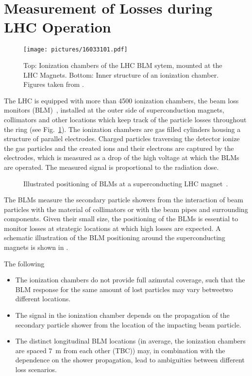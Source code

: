 \section{Measurement of Losses during LHC Operation}
%
\begin{figure}[b]  
    \centering
    \texttt{[image: pictures/16033101.pdf]}
    \caption{Top: Ionization chambers of the LHC BLM sytem, mounted at the LHC Magnets. Bottom: Inner structure of an ionization chamber. Figures taken from \cite{BLM_homepage}.}  
    \label{pic:16033101}
\end{figure}

The LHC is equipped with more than 4500 ionization chambers, the beam loss monitors (BLM)~\cite{BLMref1,BLMref02}, installed at the outer side of superconduction magnets, collimators and other locations which keep track of the particle losses throughout the ring (see Fig.~\ref{pic:16033101}). The ionization chambers are gas filled cylinders housing a structure of parallel electrodes. Charged particles traversing the detector ionize the gas particles and the created ions and their electrons are captured by the electrodes, which is measured as a drop of the high voltage at which the BLMs are operated. The measured signal is proportional to the radiation dose.

%
\begin{figure}[tb]
    \centering
    \def\svgwidth{1.0\linewidth}
    
    \caption{Illustrated positioning of BLMs at a superconducting LHC magnet~\cite{dehning2002lhc}.}
    \label{pic:14061701}
\end{figure}
%
The BLMs measure the secondary particle showers from the interaction of beam particles with the material of collimators or with the beam pipes and surrounding components. Given their small size, the positioning of the BLMs is essential to monitor losses at strategic locations at which high losses are expected. A schematic illustration of the BLM positioning around the superconducting magnets is shown in . 

The following 
\begin{itemize}
  \item The ionization chambers do not provide full azimutal coverage, such that the BLM response for the same amount of lost particles may vary betweetwo different locations.
  \item The signal in the ionization chamber depends on the propagation of the secondary particle shower from the location of the impacting beam particle.
  \item The distinct longitudinal BLM locations (in average, the ionization chambers are spaced 7~m from each other (TBC)) may, in combination with the dependence on the shower propagation, lead to ambiguities between different loss scenarios.
\end{itemize}

